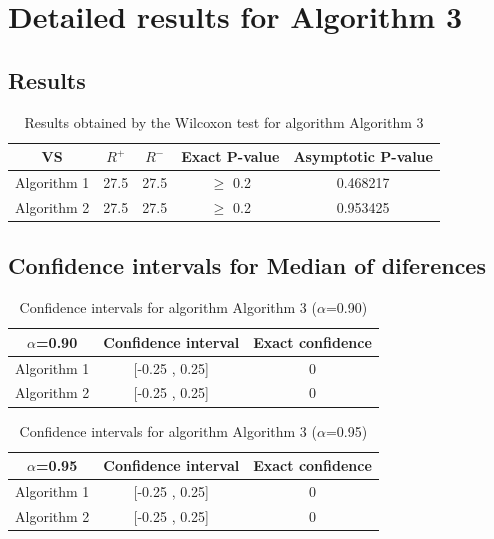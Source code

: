 \documentclass[a4paper,10pt]{article}
\begin{document}
 \clearpage 


\section{Detailed results for Algorithm 3}


\subsection{Results}

\begin{table}[!htp]
\centering\small
\begin{tabular}{
|c|c|c|c|c|}
\hline
 VS & $R^{+}$ & $R^{-}$ & Exact P-value & Asymptotic P-value \\ \hline 
Algorithm 1 & 27.5 & 27.5 & $\geq$ 0.2 & 0.468217\\ \hline 
Algorithm 2 & 27.5 & 27.5 & $\geq$ 0.2 & 0.953425\\ \hline 

\end{tabular}
\caption{Results obtained by the Wilcoxon test for algorithm Algorithm 3}
\end{table}

\subsection{Confidence intervals for Median of diferences}

\begin{table}[!htp]
\centering\small
\begin{tabular}{
|c|c|c|}
\hline
 $\alpha$=0.90 & Confidence interval & Exact confidence \\ \hline 
Algorithm 1 & [-0.25 , 0.25] & 0\\ \hline 
Algorithm 2 & [-0.25 , 0.25] & 0\\ \hline 

\end{tabular}
\caption{Confidence intervals for algorithm Algorithm 3 ($\alpha$=0.90)}
\end{table}
\begin{table}[!htp]
\centering\small
\begin{tabular}{
|c|c|c|}
\hline
 $\alpha$=0.95 & Confidence interval & Exact confidence \\ \hline 
Algorithm 1 & [-0.25 , 0.25] & 0\\ \hline 
Algorithm 2 & [-0.25 , 0.25] & 0\\ \hline 

\end{tabular}
\caption{Confidence intervals for algorithm Algorithm 3 ($\alpha$=0.95)}
\end{table}

 \clearpage 
\end{document}
